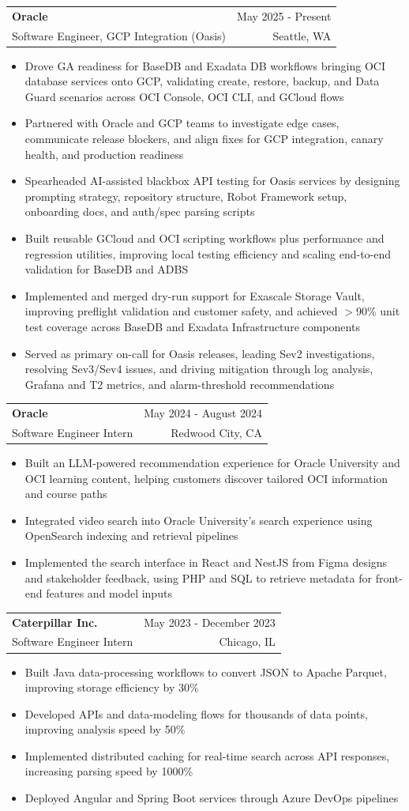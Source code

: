\documentclass[letterpaper,11pt]{article}
\makeatletter
\newcommand{\resumeItem}[1]{
  \item\small{
    {#1 \vspace{-2pt}}
  }
}
\newcommand{\resumeSubheading}[4]{
  \vspace{-2pt}\item
    \begin{tabular*}{0.97\textwidth}[t]{l@{\extracolsep{\fill}}r}
      \textbf{#1} & #2 \\
      {\small#3} & {\small #4} \\
    \end{tabular*}\vspace{-7pt}
}
\newcommand{\resumeItemListStart}{\begin{itemize}}
\newcommand{\resumeItemListEnd}{\end{itemize}\vspace{-5pt}}
\makeatother
\begin{document}
    \resumeSubheading
  {Oracle}{May 2025 - Present}
  {Software Engineer, GCP Integration (Oasis)}{Seattle, WA}
  \resumeItemListStart
    \resumeItem{Drove GA readiness for BaseDB and Exadata DB workflows bringing OCI database services onto GCP, validating create, restore, backup, and Data Guard scenarios across OCI Console, OCI CLI, and GCloud flows}
    \resumeItem{Partnered with Oracle and GCP teams to investigate edge cases, communicate release blockers, and align fixes for GCP integration, canary health, and production readiness}
    \resumeItem{Spearheaded AI-assisted blackbox API testing for Oasis services by designing prompting strategy, repository structure, Robot Framework setup, onboarding docs, and auth/spec parsing scripts}
    \resumeItem{Built reusable GCloud and OCI scripting workflows plus performance and regression utilities, improving local testing efficiency and scaling end-to-end validation for BaseDB and ADBS}
    \resumeItem{Implemented and merged dry-run support for Exascale Storage Vault, improving preflight validation and customer safety, and achieved $>$90\% unit test coverage across BaseDB and Exadata Infrastructure components}
    \resumeItem{Served as primary on-call for Oasis releases, leading Sev2 investigations, resolving Sev3/Sev4 issues, and driving mitigation through log analysis, Grafana and T2 metrics, and alarm-threshold recommendations}
  \resumeItemListEnd

    \resumeSubheading
      {Oracle}{May 2024 - August 2024}
      {Software Engineer Intern}{Redwood City, CA}
      \resumeItemListStart
        \resumeItem{Built an LLM-powered recommendation experience for Oracle University and OCI learning content, helping customers discover tailored OCI information and course paths}
        \resumeItem{Integrated video search into Oracle University's search experience using OpenSearch indexing and retrieval pipelines}
        \resumeItem{Implemented the search interface in React and NestJS from Figma designs and stakeholder feedback, using PHP and SQL to retrieve metadata for front-end features and model inputs}
      \resumeItemListEnd

    \resumeSubheading
      {Caterpillar Inc.}{May 2023 - December 2023}
      {Software Engineer Intern}{Chicago, IL}
      \resumeItemListStart
        \resumeItem{Built Java data-processing workflows to convert JSON to Apache Parquet, improving storage efficiency by 30\%}
        \resumeItem{Developed APIs and data-modeling flows for thousands of data points, improving analysis speed by 50\%}
        \resumeItem{Implemented distributed caching for real-time search across API responses, increasing parsing speed by 1000\%}
        \resumeItem{Deployed Angular and Spring Boot services through Azure DevOps pipelines}
      \resumeItemListEnd
\end{document}
